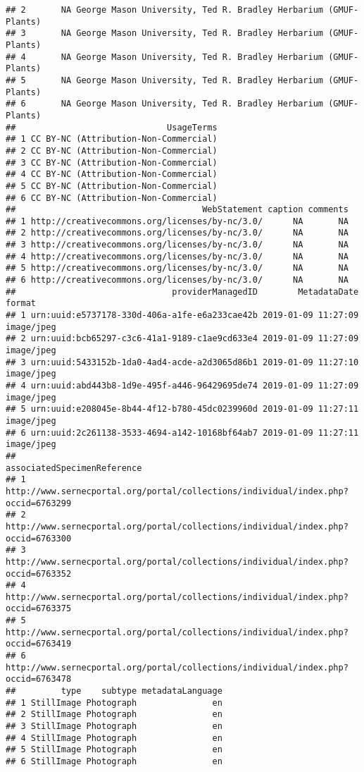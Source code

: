 \documentclass[
]{article}
\begin{document}
\begin{verbatim}
## 2       NA George Mason University, Ted R. Bradley Herbarium (GMUF-Plants)
## 3       NA George Mason University, Ted R. Bradley Herbarium (GMUF-Plants)
## 4       NA George Mason University, Ted R. Bradley Herbarium (GMUF-Plants)
## 5       NA George Mason University, Ted R. Bradley Herbarium (GMUF-Plants)
## 6       NA George Mason University, Ted R. Bradley Herbarium (GMUF-Plants)
##                              UsageTerms
## 1 CC BY-NC (Attribution-Non-Commercial)
## 2 CC BY-NC (Attribution-Non-Commercial)
## 3 CC BY-NC (Attribution-Non-Commercial)
## 4 CC BY-NC (Attribution-Non-Commercial)
## 5 CC BY-NC (Attribution-Non-Commercial)
## 6 CC BY-NC (Attribution-Non-Commercial)
##                                     WebStatement caption comments
## 1 http://creativecommons.org/licenses/by-nc/3.0/      NA       NA
## 2 http://creativecommons.org/licenses/by-nc/3.0/      NA       NA
## 3 http://creativecommons.org/licenses/by-nc/3.0/      NA       NA
## 4 http://creativecommons.org/licenses/by-nc/3.0/      NA       NA
## 5 http://creativecommons.org/licenses/by-nc/3.0/      NA       NA
## 6 http://creativecommons.org/licenses/by-nc/3.0/      NA       NA
##                               providerManagedID        MetadataDate     format
## 1 urn:uuid:e5737178-330d-406a-a1fe-e6a233cae42b 2019-01-09 11:27:09 image/jpeg
## 2 urn:uuid:bcb65297-c3c6-41a1-9189-c1ae9cd633e4 2019-01-09 11:27:09 image/jpeg
## 3 urn:uuid:5433152b-1da0-4ad4-acde-a2d3065d86b1 2019-01-09 11:27:10 image/jpeg
## 4 urn:uuid:abd443b8-1d9e-495f-a446-96429695de74 2019-01-09 11:27:09 image/jpeg
## 5 urn:uuid:e208045e-8b44-4f12-b780-45dc0239960d 2019-01-09 11:27:11 image/jpeg
## 6 urn:uuid:2c261138-3533-4694-a142-10168bf64ab7 2019-01-09 11:27:11 image/jpeg
##                                                         associatedSpecimenReference
## 1 http://www.sernecportal.org/portal/collections/individual/index.php?occid=6763299
## 2 http://www.sernecportal.org/portal/collections/individual/index.php?occid=6763300
## 3 http://www.sernecportal.org/portal/collections/individual/index.php?occid=6763352
## 4 http://www.sernecportal.org/portal/collections/individual/index.php?occid=6763375
## 5 http://www.sernecportal.org/portal/collections/individual/index.php?occid=6763419
## 6 http://www.sernecportal.org/portal/collections/individual/index.php?occid=6763478
##         type    subtype metadataLanguage
## 1 StillImage Photograph               en
## 2 StillImage Photograph               en
## 3 StillImage Photograph               en
## 4 StillImage Photograph               en
## 5 StillImage Photograph               en
## 6 StillImage Photograph               en
\end{verbatim}
\end{document}
